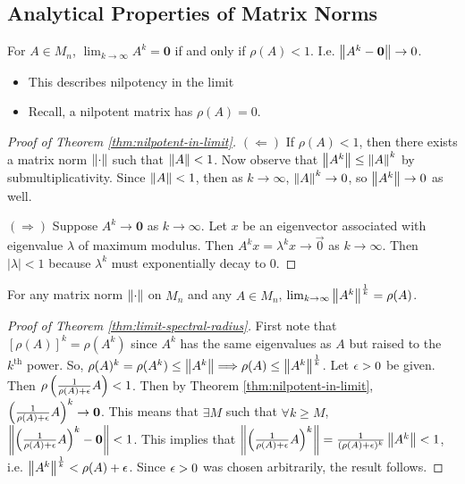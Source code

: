 \subsection{Analytical Properties of Matrix Norms}
\begin{theorem}
\label{thm:nilpotent-in-limit}
For $A \in M_n$, $\lim_{k\rightarrow\infty}A^k = \mathbf{0}$ if and only if $\rho(A) < 1$. I.e. $\left\lVert A^k-\mathbf{0}\right\rVert \rightarrow 0$.
\begin{itemize}
    \item This describes nilpotency in the limit
    \item Recall, a nilpotent matrix has $\rho(A) = 0$.
\end{itemize}
\end{theorem}
\begin{proof}[Proof of Theorem \ref{thm:nilpotent-in-limit}]
$(\Longleftarrow)$ If $\rho(A) < 1$, then there exists a matrix norm $\left\lVert\cdot\right\rVert$ such that $\left\lVert A\right\rVert < 1$. Now observe that $\left\lVert A^k\right\rVert \le \left\lVert A\right\rVert^k$ by submultiplicativity. Since $\left\lVert A\right\rVert < 1$, then as $k \rightarrow \infty$, $\left\lVert A\right\rVert^k \rightarrow 0$, so $\left\lVert A^k\right\rVert\rightarrow0$ as well.

$(\Longrightarrow)$ Suppose $A^k \rightarrow \mathbf{0}$ as $k\rightarrow \infty$. Let $x$ be an eigenvector associated with eigenvalue $\lambda$ of maximum modulus. Then $A^kx = \lambda^k x \rightarrow \Vec{0}$ as $k \rightarrow\infty$. Then $|\lambda| < 1$ because $\lambda^k$ must exponentially decay to 0.
\end{proof}

\begin{theorem}
\label{thm:limit-spectral-radius}
For any matrix norm $\left\lVert\cdot\right\rVert$ on $M_n$ and any $A \in M_n$, $\lim_{k\rightarrow\infty} \left\lVert A^k\right\rVert^{\frac1k} = \rho(A)$.
\end{theorem}

\begin{proof}[Proof of Theorem \ref{thm:limit-spectral-radius}]
First note that $[\rho(A)]^k = \rho(A^k)$ since $A^k$ has the same eigenvalues as $A$ but raised to the $k^{\text{th}}$ power. So, $\rho(A)^k = \rho(A^k) \le \left\lVert A^k\right\rVert \Longrightarrow \rho(A)\le\left\lVert A^k\right\rVert^{\frac{1}{k}}$. Let $\epsilon>0$ be given. Then $\rho\left(\frac{1}{\rho(A)+\epsilon}A\right) < 1$. Then by Theorem \ref{thm:nilpotent-in-limit}, $\left(\frac{1}{\rho(A)+\epsilon}A\right)^k \rightarrow \mathbf{0}$. This means that $\exists M$ such that $\forall k \ge M$, $\left\lVert\left(\frac{1}{\rho(A)+\epsilon}A\right)^k - \mathbf{0}\right\rVert < 1$. This implies that $\left\lVert\left(\frac{1}{\rho(A)+\epsilon}A\right)^k\right\rVert = \frac{1}{(\rho(A)+\epsilon)^k}\left\lVert A^k\right\rVert < 1$, i.e. $\left\lVert A^k\right\rVert^{\frac1k} < \rho(A)+\epsilon$. Since $\epsilon > 0$ was chosen arbitrarily, the result follows.
\end{proof}

